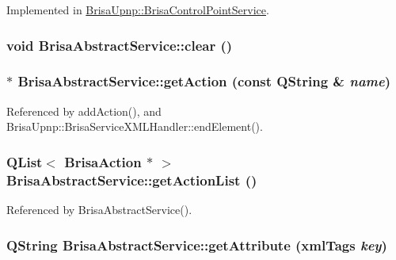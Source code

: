 Implemented in \hyperlink{classBrisaUpnp_1_1BrisaControlPointService_a2ceea746418759667ca7393abbb7a412}{BrisaUpnp::BrisaControlPointService}.\hypertarget{classBrisaUpnp_1_1BrisaAbstractService_ab71b54a010710a00eac20e3ff0f4b216}{
\subsubsection[{clear}]{\setlength{\rightskip}{0pt plus 5cm}void BrisaAbstractService::clear ()}}
\label{classBrisaUpnp_1_1BrisaAbstractService_ab71b54a010710a00eac20e3ff0f4b216}
\hypertarget{classBrisaUpnp_1_1BrisaAbstractService_a25e82678349b2a96b59c83b205a1b965}{
\subsubsection[{getAction}]{ $\ast$ BrisaAbstractService::getAction (const QString \& {\em name})}}
\label{classBrisaUpnp_1_1BrisaAbstractService_a25e82678349b2a96b59c83b205a1b965}


Referenced by addAction(), and BrisaUpnp::BrisaServiceXMLHandler::endElement().\hypertarget{classBrisaUpnp_1_1BrisaAbstractService_a44420fad863b160c83ab07d87c2f87e5}{
\subsubsection[{getActionList}]{\setlength{\rightskip}{0pt plus 5cm}QList$<$ {\bf BrisaAction} $\ast$ $>$ BrisaAbstractService::getActionList ()}}
\label{classBrisaUpnp_1_1BrisaAbstractService_a44420fad863b160c83ab07d87c2f87e5}


Referenced by BrisaAbstractService().\hypertarget{classBrisaUpnp_1_1BrisaAbstractService_a6e14662c2e901ce3bfd9ccd0646a3b06}{
\subsubsection[{getAttribute}]{\setlength{\rightskip}{0pt plus 5cm}QString BrisaAbstractService::getAttribute ({\bf xmlTags} {\em key})}}
\label{classBrisaUpnp_1_1BrisaAbstractService_a6e14662c2e901ce3bfd9ccd0646a3b06}


